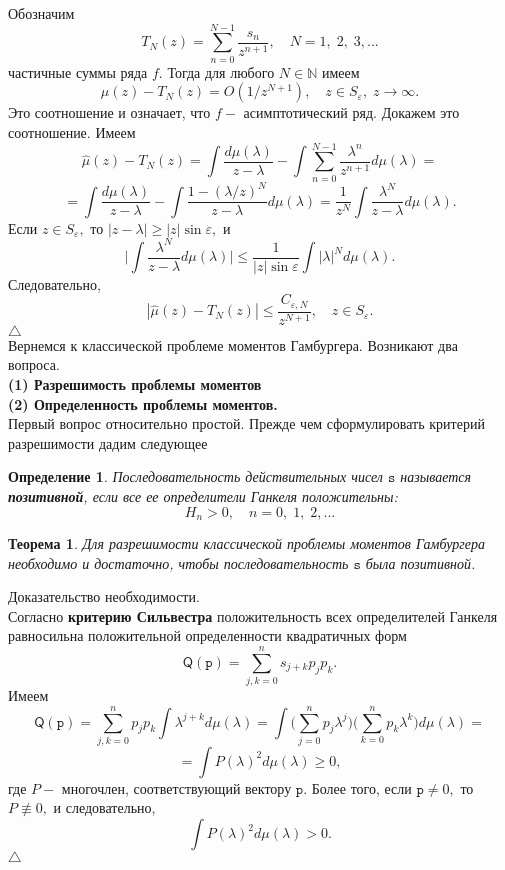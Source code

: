 \documentclass[12pt,a4paper]{article}
\theoremstyle{plain}   \newtheorem{Pro}{Задача}
\newtheorem{Def}{Определение}
\newtheorem{The}{Теорема}
\begin{document}
Обозначим
$$
  T_N (z)=\sum _{n=0}^{N-1}
  \frac{s_n}{z^{n+1}},
  \quad N=1, \; 2, \; 3,...
$$
частичные суммы ряда
$ f . $
Тогда для любого
$ N \in \mathbb{N} $
имеем
$$
  \hat \mu (z)-T_N (z)=O(1/z^{N+1}),
  \quad z \in S_{\varepsilon}, \; z \rightarrow \infty .
$$
Это соотношение и означает, что
$ f - $
асимптотический ряд. Докажем это соотношение. Имеем
$$
  \hat \mu (z)-T_N (z)=
  \int \frac{d \mu ( \lambda )}{z-\lambda}-
  \int \sum _{n=0}^{N-1} \frac{\lambda ^n}{z^{n+1}}
  d \mu ( \lambda )=
$$
$$
  =\int \frac{d \mu ( \lambda )}{z-\lambda}-
  \int \frac{1-(\lambda /z)^N}{z-\lambda}d \mu (\lambda )=
  \frac{1}{z^N} \int \frac{\lambda ^N}{z-\lambda}d \mu ( \lambda ).
$$
Если
$ z \in S_{\varepsilon} , $
то
$ |z-\lambda | \geq |z| \sin \varepsilon , $
и
$$
  \biggl | \int \frac{\lambda ^N}{z-\lambda}d \mu (\lambda ) \biggr | \leq
  \frac{1}{|z| \sin \varepsilon } \int | \lambda |^N
  d \mu ( \lambda ).
$$
Следовательно,
$$
  | \hat \mu (z)-T_N (z)| \leq
  \frac{C_{\varepsilon , N}}{z^{N+1}},
  \quad z \in S_{\varepsilon}.
$$
$ \triangle $
\\

Вернемся к классической проблеме моментов Гамбургера.
Возникают два вопроса.
\\
{\bfseries (1) Разрешимость проблемы моментов}
\\
{\bfseries (2) Определенность проблемы моментов.}
\\
Первый вопрос относительно простой. Прежде чем
сформулировать критерий разрешимости дадим следующее
\begin{Def}
Последовательность действительных чисел
$ \mathtt{s} $
называется
{\bfseries позитивной},
если все ее определители Ганкеля положительны:
$$
  H_n >0, \quad n=0, \; 1, \; 2,...
$$
\end{Def}
\begin{The}
Для разрешимости классической проблемы моментов Гамбургера
необходимо и достаточно, чтобы последовательность
$ \mathtt{s} $
была позитивной.
\end{The}
{\Large Доказательство}
необходимости.\\
Согласно
{\bfseries критерию Сильвестра}
положительность всех
определителей Ганкеля равносильна положительной определенности
квадратичных форм
$$
  \mathsf{Q} ( \mathtt{p} )=
  \sum _{j,k=0}^n s_{j+k}p_j p_k .
$$
Имеем
$$
  \mathsf{Q} (\mathtt{p})=
  \sum _{j,k=0}^{n}p_j p_k \int \lambda ^{j+k} d \mu (\lambda )=
  \int \biggl ( \sum _{j=0}^{n} p_j \lambda ^j \biggr )
  \biggl ( \sum _{k=0}^{n} p_k \lambda ^k \biggr )
  d \mu (\lambda )=
$$
$$
  =\int P( \lambda )^2 d \mu (\lambda ) \geq 0,
$$
где
$ P - $
многочлен, соответствующий вектору
$ \mathtt{p} . $
Более того, если
$ \mathtt{p} \not = 0, $
то
$ P \not \equiv 0 , $
и следовательно,
$$
  \int P(\lambda )^2 d \mu ( \lambda ) >0.
$$
$ \triangle $
\newpage
\end{document}
